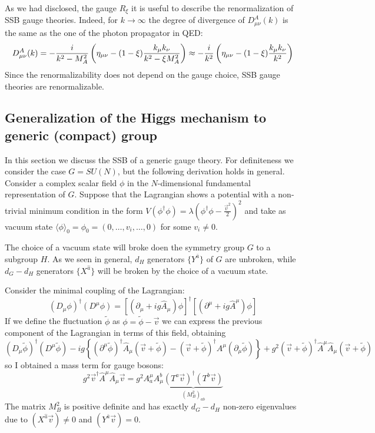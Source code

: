 \documentclass[TheoreticalPhy_ModB.tex]{subfiles}
\begin{document}
As we had disclosed, the gauge $R_\xi$ it is useful to describe the renormalization of SSB gauge theories. Indeed, for $k\to\infty$ the degree of divergence of $D^A_{\mu\nu}(k)$ is the same as the one of the photon propagator in QED:
\[D^A_{\mu\nu}(k)=-\frac i{k^2-M_A^2}\left(\eta_{\mu\nu}-(1-\xi)\frac{k_\mu k_\nu}{k^2-\xi M_A^2}\right)
\approx -\frac i{k^2}\left(\eta_{\mu\nu}-(1-\xi)\frac{k_\mu k_\nu}{k^2}\right)\]
Since the renormalizability does not depend on the gauge choice, SSB gauge theories are renormalizable. 

\subsection{Generalization of the Higgs mechanism to generic (compact) group}

In this section we discuss the SSB of a generic gauge theory. For definiteness we consider the case $G=SU(N)$, but the following derivation holds in general. Consider a complex scalar field $\phi$ in the $N$-dimensional fundamental representation of $G$. Suppose that the Lagrangian shows a potential with a non-trivial minimum condition in the form $V(\phi^\dagger\phi)=\lambda(\phi^\dagger\phi-\frac{\vec v^2}2)^2$ and take as vacuum state $\langle\phi\rangle_0=\phi_0=(0,\dots,v_i,\dots,0)$ for some $v_i\neq0$. 

The choice of a vacuum state will broke doen the symmetry group $G$ to a subgroup $H$. As we seen in general, $d_H$ generators $\{Y^{\bar a}\}$ of $G$ are unbroken, while $d_G-d_H$ generators $\{X^{\hat a}\}$ will be broken by the choice of a vacuum state. 

Consider the minimal coupling of the Lagrangian:
\[(D_\mu\phi)^\dagger(D^\mu\phi)=[(\partial_\mu+ig\hat A_\mu)\phi]^\dagger[(\partial^\mu+ig\hat A^\mu)\phi]\]
If we define the fluctuation $\tilde\phi$ as $\phi=\tilde\phi-\vec v$ we can express the previous component of the Lagrangian in terms of this field, obtaining
\[(D_\mu\tilde\phi)^\dagger(D^\mu\tilde\phi)-ig\left\{(\partial^\mu\tilde\phi)^\dagger\hat A_\mu(\vec v+\tilde\phi)-(\vec v+\tilde\phi)^\dagger A^\mu(\partial_\mu\tilde\phi)\right\}+g^2(\vec v+\tilde\phi)^\dagger\hat A^\mu\hat A_\mu(\vec v+\tilde\phi)\]
so I obtained a mass term for gauge bosons:
\[g^2\vec v^\dagger\hat A^\mu\hat A_\mu\vec v=g^2A_a^\mu A_\mu^b\underbrace{(T^a\vec v)^\dagger(T^b\vec v)}_{(M_B^2)_{ab}}\]
The matrix $M_B^2$ is positive definite and has exactly $d_G-d_H$ non-zero eigenvalues due to $(X^{\hat a}\vec v)\neq0$ and $( Y^{\bar a}\vec v)=0$. 
\end{document}
